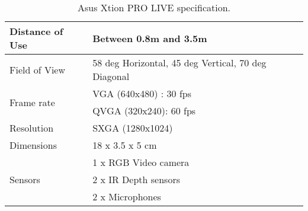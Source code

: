 \begin{table}
	[h] \centering \caption{Asus Xtion PRO LIVE specification. \cite{9} } \label{tb:xtion:spec} 
	\begin{tabular}
		{|l|l|} 
		\hline Distance of Use & Between 0.8m and 3.5m \\		
		\hline Field of View & 58 deg Horizontal, 45 deg Vertical, 70 deg Diagonal \\
		\hline \multirow{2}{*}{Frame rate} & VGA (640x480) : 30 fps\\
		& QVGA (320x240): 60 fps \\
		\hline Resolution & SXGA (1280x1024) \\
		\hline Dimensions & 18 x 3.5 x 5 cm \\	
		\hline \multirow{3}{*}{Sensors} & 1 x RGB Video camera \\
		& 2 x IR Depth sensors  \\
		& 2 x Microphones\\
		\hline 
	\end{tabular}
\end{table}
